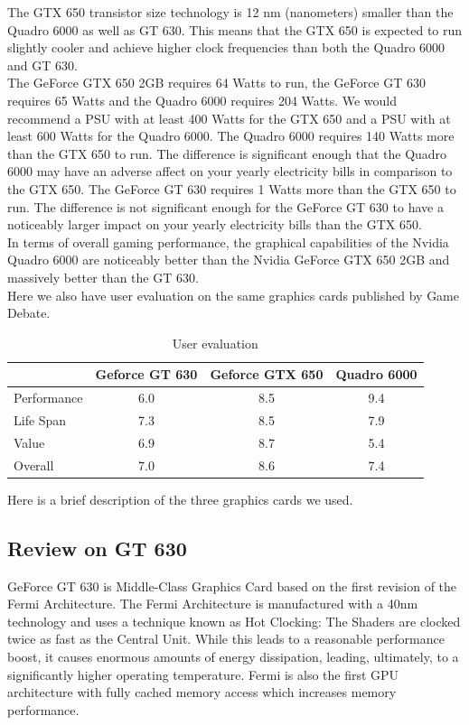 \documentclass[paper=a4, fontsize=11pt]{scrartcl}
\numberwithin{equation}{section}		%
\numberwithin{figure}{section}			%
\numberwithin{table}{section}				%
\begin{document}
The GTX 650 transistor size technology is 12 nm (nanometers) smaller than the Quadro 6000 as well as GT 630. This means that the GTX 650 is expected to run slightly cooler and achieve higher clock frequencies than both the Quadro 6000 and GT 630.\\


The GeForce GTX 650 2GB requires 64 Watts to run, the GeForce GT 630 requires 65 Watts and the Quadro 6000 requires 204 Watts. We would recommend a PSU with at least 400 Watts for the GTX 650 and a PSU with at least 600 Watts for the Quadro 6000. The Quadro 6000 requires 140 Watts more than the GTX 650 to run. The difference is significant enough that the Quadro 6000 may have an adverse affect on your yearly electricity bills in comparison to the GTX 650. The GeForce GT 630 requires 1 Watts more than the GTX 650 to run. The difference is not significant enough for the GeForce GT 630 to have a noticeably larger impact on your yearly electricity bills than the GTX 650. \\


In terms of overall gaming performance, the graphical capabilities of the Nvidia Quadro 6000 are noticeably better than the Nvidia GeForce GTX 650 2GB and massively better than the GT 630. \\


Here we also have user evaluation on the same graphics cards published by Game Debate.

\begin{table}[!h]
\caption{User evaluation }
\centering
\begin{tabular}{|l|c|c|c|}
	\hline
	& Geforce GT 630 & Geforce GTX 650 & Quadro 6000 \\
	\hline
      Performance & 6.0 & 8.5 & 9.4 \\
	\hline
    Life Span & 7.3 & 8.5 & 7.9 \\
	\hline
    Value & 6.9 & 8.7 & 5.4\\
	\hline
	Overall & 7.0 & 8.6 & 7.4 \\
	\hline

\end{tabular}
\label{User evaluation}
\end{table}

Here is a brief description of the three graphics cards we used.

\subsection {Review on GT 630}
GeForce GT 630 is Middle-Class Graphics Card based on the first revision of the Fermi Architecture. The Fermi Architecture is manufactured with a 40nm technology and uses a technique known as Hot Clocking: The Shaders are clocked twice as fast as the Central Unit. While this leads to a reasonable performance boost, it causes enormous amounts of energy dissipation, leading, ultimately, to a significantly higher operating temperature.
Fermi is also the first GPU architecture with fully cached memory access which increases memory performance. 
\end{document}
